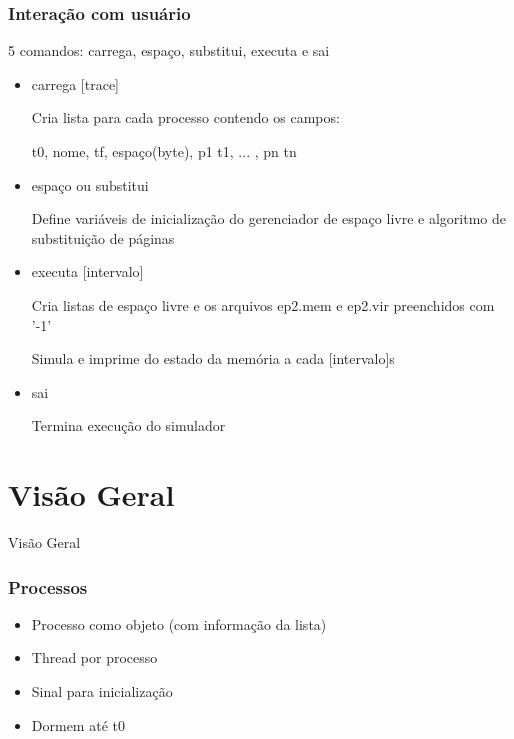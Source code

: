\documentclass{beamer}
\begin{document}
\begin{frame}
\frametitle{Interação com usuário}
5 comandos: carrega, espaço, substitui, executa e sai
\begin{itemize}
\item carrega [trace] 

  Cria lista para cada processo contendo os campos: 
  
  t0, nome, tf, espaço(byte), p1 t1, ... , pn tn
 
\item espaço ou substitui

  Define variáveis de inicialização do gerenciador de espaço livre e algoritmo de substituição de páginas
\end{itemize}
\end{frame}


\begin{frame}

\begin{itemize}
\frametitle{Interação com usuário}
\item executa [intervalo]

  Cria listas de espaço livre e os arquivos ep2.mem e ep2.vir preenchidos com '-1'
  
  Simula e imprime do estado da memória a cada [intervalo]s
  
\item sai

  Termina execução do simulador  

\end{itemize}
\end{frame}


\section{Visão Geral} 
\begin{frame}
\begin{LARGE}
\begin{center}
Visão Geral
\end{center}
\end{LARGE}
\end{frame}


\begin{frame}
\frametitle{Processos}

\begin{itemize}
\item Processo como objeto (com informação da lista)

\item Thread por processo

\item Sinal para inicialização

\item Dormem até t0

\end{itemize}
\justifying
\end{frame}
\end{document}
